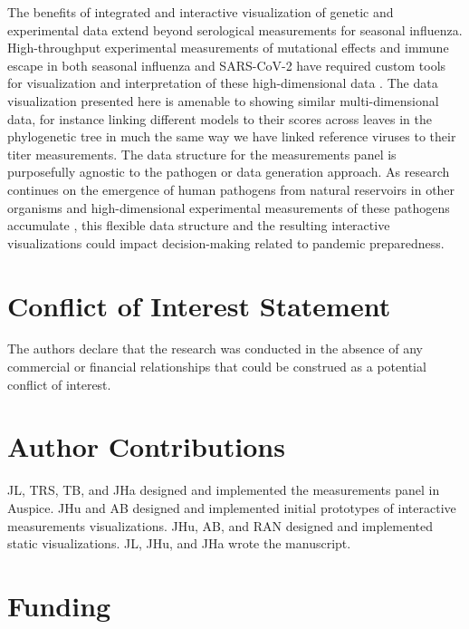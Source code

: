 \documentclass[utf8]{FrontiersinHarvard} %
\begin{document}
The benefits of integrated and interactive visualization of genetic and experimental data extend beyond serological measurements for seasonal influenza.
High-throughput experimental measurements of mutational effects and immune escape in both seasonal influenza and SARS-CoV-2 have required custom tools for visualization and interpretation of these high-dimensional data \citep{Hilton2020,Aksamentov2021,Garrett2021,Greaney2022}.
The data visualization presented here is amenable to showing similar multi-dimensional data, for instance linking different models to their scores across leaves in the phylogenetic tree in much the same way we have linked reference viruses to their titer measurements.
The data structure for the measurements panel is purposefully agnostic to the pathogen or data generation approach.
As research continues on the emergence of human pathogens from natural reservoirs in other organisms \citep{Olival2017,Leendertz2016} and high-dimensional experimental measurements of these pathogens accumulate \citep{Soh2019,Starr2022}, this flexible data structure and the resulting interactive visualizations could impact decision-making related to pandemic preparedness.

\section*{Conflict of Interest Statement}

The authors declare that the research was conducted in the absence of any commercial or financial relationships that could be construed as a potential conflict of interest.

\section*{Author Contributions}

JL, TRS, TB, and JHa designed and implemented the measurements panel in Auspice.
JHu and AB designed and implemented initial prototypes of interactive measurements visualizations.
JHu, AB, and RAN designed and implemented static visualizations.
JL, JHu, and JHa wrote the manuscript.

\section*{Funding}
\end{document}
